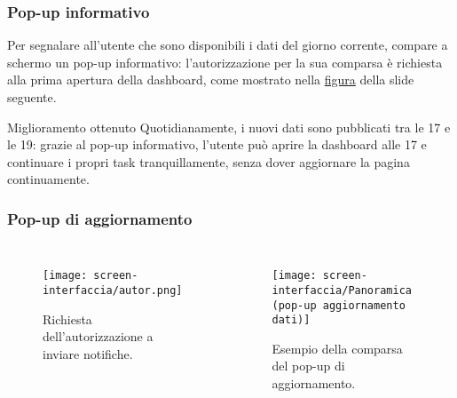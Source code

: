 \begin{frame}
    \frametitle{Pop-up informativo}
    \label{f:pop}
    Per segnalare all'utente che sono disponibili i dati del giorno corrente, compare a schermo un pop-up informativo: l'autorizzazione per la sua comparsa è richiesta alla prima apertura della dashboard, come mostrato nella \hyperlink{fig:autoriz}{figura} della slide seguente.
    \vspace{-30pt}
    \begin{alertblock}{Miglioramento ottenuto}
        Quotidianamente, i nuovi dati sono pubblicati tra le 17 e le 19: grazie al pop-up informativo, l'utente può aprire la dashboard alle 17 e continuare i propri task tranquillamente, senza dover aggiornare la pagina continuamente.       
    \end{alertblock}

\end{frame}

\begin{frame}
    \frametitle{Pop-up di aggiornamento}

    \begin{columns}
        
        \begin{figure}
            \centering
            \texttt{[image: screen-interfaccia/autor.png]}
            \caption{Richiesta dell'autorizzazione a inviare notifiche.}
            \label{fig:autoriz}
        \end{figure}

        \begin{figure}
            \centering
            \texttt{[image: screen-interfaccia/Panoramica (pop-up aggiornamento dati)]}
            \caption{Esempio della comparsa del pop-up di aggiornamento.}
        \end{figure}

    \end{columns}

    

\end{frame}